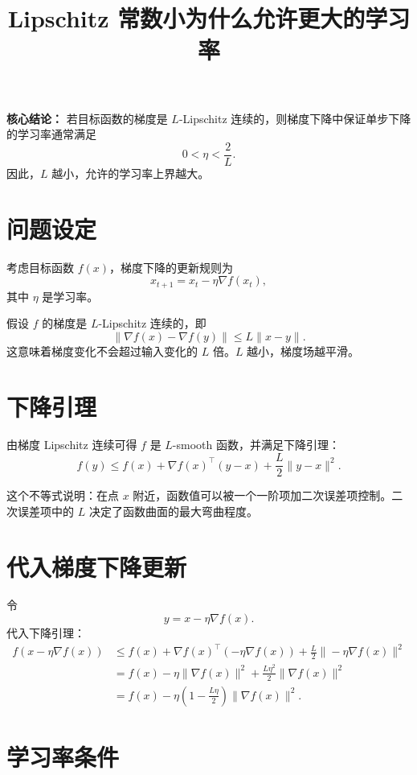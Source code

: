 \documentclass[11pt,fontset=fandol]{ctexart}
\title{\bfseries Lipschitz 常数小为什么允许更大的学习率}
\author{}
\date{}
\begin{document}
\maketitle
\vspace{-2em}

\begin{center}
\colorbox{soft}{
  \parbox{0.9\linewidth}{
    \textbf{核心结论：}
    若目标函数的梯度是 \(L\)-Lipschitz 连续的，则梯度下降中保证单步下降的学习率通常满足
    \[
      0<\eta<\frac{2}{L}.
    \]
    因此，\(L\) 越小，允许的学习率上界越大。
  }
}
\end{center}

\section{问题设定}

考虑目标函数 \(f(x)\)，梯度下降的更新规则为
\[
  x_{t+1}=x_t-\eta \nabla f(x_t),
\]
其中 \(\eta\) 是学习率。

假设 \(f\) 的梯度是 \(L\)-Lipschitz 连续的，即
\[
  \|\nabla f(x)-\nabla f(y)\|\le L\|x-y\|.
\]
这意味着梯度变化不会超过输入变化的 \(L\) 倍。\(L\) 越小，梯度场越平滑。

\section{下降引理}

由梯度 Lipschitz 连续可得 \(f\) 是 \(L\)-smooth 函数，并满足下降引理：
\[
  f(y)\le f(x)+\nabla f(x)^\top (y-x)+\frac{L}{2}\|y-x\|^2.
\]

这个不等式说明：在点 \(x\) 附近，函数值可以被一个一阶项加二次误差项控制。二次误差项中的 \(L\) 决定了函数曲面的最大弯曲程度。

\section{代入梯度下降更新}

令
\[
  y=x-\eta \nabla f(x).
\]
代入下降引理：
\[
\begin{aligned}
  f(x-\eta \nabla f(x))
  &\le
  f(x)+\nabla f(x)^\top(-\eta \nabla f(x))
  +\frac{L}{2}\|-\eta \nabla f(x)\|^2 \\
  &=
  f(x)-\eta\|\nabla f(x)\|^2
  +\frac{L\eta^2}{2}\|\nabla f(x)\|^2 \\
  &=
  f(x)-\eta\left(1-\frac{L\eta}{2}\right)\|\nabla f(x)\|^2.
\end{aligned}
\]

\section{学习率条件}
\end{document}
